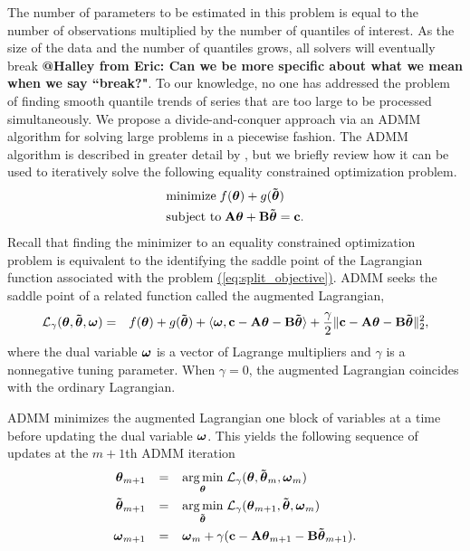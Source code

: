 \documentclass[12pt]{article}
\makeatletter
\newcommand{\Halley}[2]{{\bf {\color{purple}@Halley from #1: #2}}\xspace}
\newcommand{\Eqn}[1]{\hyperref[eq:#1]{{\rm (\ref*{eq:#1})}}} %
\newcommand{\Eqn}[1]{{(\ref{eq:#1})}} %
\newcommand{\amp}{\mathop{\:\:\,}\nolimits}
\newcommand{\V}[1]{{\bm{\mathbf{\MakeLowercase{#1}}}}} %
\newcommand{\Vtilde}[1]{{\bm{\tilde \mathbf{\MakeLowercase{#1}}}}} %
\newcommand{\M}[1]{{\bm{\mathbf{\MakeUppercase{#1}}}}} %
\makeatother
\begin{document}
The number of parameters to be estimated in this problem is equal to the number of observations multiplied by the number of quantiles of interest. As the size of the data and the number of quantiles grows, all solvers will eventually break \Halley{Eric}{Can we be more specific about what we mean when we say ``break?"}. To our knowledge, no one has addressed the problem of finding smooth quantile trends of series that are too large to be processed simultaneously. We propose a divide-and-conquer approach via an ADMM algorithm for solving large problems in a piecewise fashion. The ADMM algorithm \citep{gabay1975dual, glowinski1975approximation} is  described in greater detail by \cite{boyd2011distributed}, but we briefly review how it can be used to iteratively solve the following equality constrained optimization problem.
\begin{equation}
\label{eq:split_objective}
\begin{split}
&\text{minimize} \; f(\V{\theta}) + g(\Vtilde{\theta}) \\
&\text{subject to} \; \M{A}\V{\theta} + \M{B}\Vtilde{\theta} = \V{c}.
\end{split}
\end{equation}
Recall that finding the minimizer to an equality constrained optimization problem is equivalent to the identifying the saddle point of the Lagrangian function associated with the problem \Eqn{split_objective}. ADMM seeks the saddle point of a related function called the augmented Lagrangian,
\begin{eqnarray*}
\mathcal{L}_{\gamma}(\V{\theta},\Vtilde{\theta},\V{\omega}) & = & f(\V{\theta}) + g(\Vtilde{\theta}) + \langle \V{\omega}, \V{c} - \M{A}\V{\theta} - \M{B}\Vtilde{\theta} \rangle
+ \frac{\gamma}{2} \lVert \V{c} - \M{A}\V{\theta} - \M{B}\Vtilde{\theta} \rVert_2^2,
\end{eqnarray*}
where the dual variable $\V{\omega}$ is a vector of Lagrange multipliers and $\gamma$ is a nonnegative tuning parameter. When $\gamma = 0$, the augmented Lagrangian coincides with the ordinary Lagrangian.

ADMM minimizes the augmented Lagrangian one block of variables at a time before updating the dual variable $\V{\omega}$. This yields the following sequence of updates at the $m+1$th ADMM iteration
\begin{equation}
\label{eq:admm_updates}
\begin{split}
\V{\theta}_{m+1} & \amp = \amp \underset{\V{\theta}}{\arg\min}\; \mathcal{L}_\gamma(\V{\theta},\Vtilde{\theta}_{m}, \V{\omega}_{m}) \\
\Vtilde{\theta}_{m+1} & \amp = \amp \underset{\Vtilde{\theta}}{\arg\min}\; \mathcal{L}_\gamma(\V{\theta}_{m+1},\Vtilde{\theta}, \V{\omega}_{m}) \\
\V{\omega}_{m+1} & \amp = \amp \V{\omega}_{m} + \gamma(\V{c} - \M{A}\V{\theta}_{m+1} - \M{B}\Vtilde{\theta}_{m+1}).
\end{split}
\end{equation}
	
\end{document}
